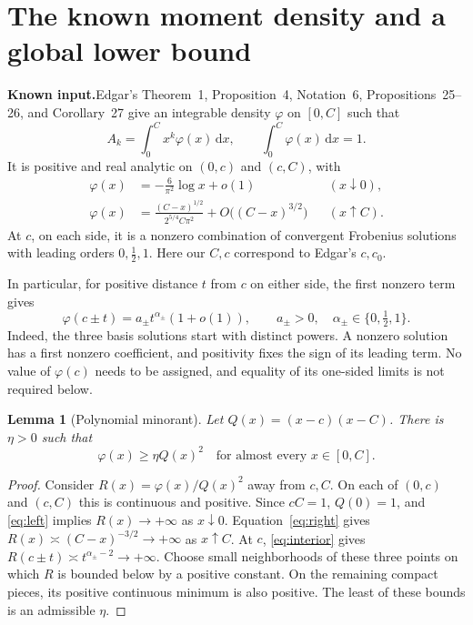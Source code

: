 \documentclass[11pt,a4paper]{article}
\numberwithin{equation}{section}
\newtheorem{lemma}[theorem]{Lemma}
\theoremstyle{remark}\newtheorem{remark}[theorem]{Remark}
\newcommand{\dd}{\,\mathrm d}
\newcommand{\sourceinput}{\textbf{Known input.}}
\begin{document}
\section{The known moment density and a global lower bound}
\label{sec:density}
\sourceinput\quad Edgar's Theorem~1, Proposition~4, Notation~6,
Propositions~25--26, and Corollary~27 \cite{edgar} give an integrable density
$\varphi$ on $[0,C]$ such that
\begin{equation}\label{eq:moments}
 A_k=\int_0^C x^k\varphi(x)\dd x,\qquad \int_0^C\varphi(x)\dd x=1.
\end{equation}
It is positive and real analytic on $(0,c)$ and $(c,C)$, with
\begin{align}
 \varphi(x)&=-\frac6{\pi^2}\log x+o(1) &&(x\downarrow0),\label{eq:left}\\
 \varphi(x)&=\frac{(C-x)^{1/2}}{2^{5/4}C\pi^2}
       +O\bigl((C-x)^{3/2}\bigr) &&(x\uparrow C).\label{eq:right}
\end{align}
At $c$, on each side, it is a nonzero combination of convergent Frobenius
solutions with leading orders $0,\tfrac12,1$. Here our $C,c$ correspond to
Edgar's $c,c_0$.

In particular, for positive distance $t$ from $c$ on either side, the first
nonzero term gives
\begin{equation}\label{eq:interior}
 \varphi(c\pm t)=a_\pm t^{\alpha_\pm}(1+o(1)),\qquad
 a_\pm>0,\quad\alpha_\pm\in\{0,\tfrac12,1\}.
\end{equation}
Indeed, the three basis solutions start with distinct powers. A nonzero
solution has a first nonzero coefficient, and positivity fixes the sign of
its leading term. No value of $\varphi(c)$ needs to be assigned, and equality
of its one-sided limits is not required below.

\begin{lemma}[Polynomial minorant]\label{lem:minorant}
Let $Q(x)=(x-c)(x-C)$. There is $\eta>0$ such that
\begin{equation}\label{eq:minorant}
 \varphi(x)\geq\eta Q(x)^2
 \quad\text{for almost every }x\in[0,C].
\end{equation}
\end{lemma}
\begin{proof}
Consider $R(x)=\varphi(x)/Q(x)^2$ away from $c,C$.
On each of $(0,c)$ and $(c,C)$ this is continuous and positive.
Since $cC=1$, $Q(0)=1$, and \eqref{eq:left} implies $R(x)\to+\infty$
as $x\downarrow0$. Equation~\eqref{eq:right} gives
$R(x)\asymp(C-x)^{-3/2}\to+\infty$ as $x\uparrow C$.
At $c$, \eqref{eq:interior} gives
$R(c\pm t)\asymp t^{\alpha_\pm-2}\to+\infty$.
Choose small neighborhoods of these three points on which $R$ is bounded
below by a positive constant. On the remaining compact pieces, its positive
continuous minimum is also positive. The least of these bounds is an
admissible $\eta$.
\end{proof}
\end{document}
